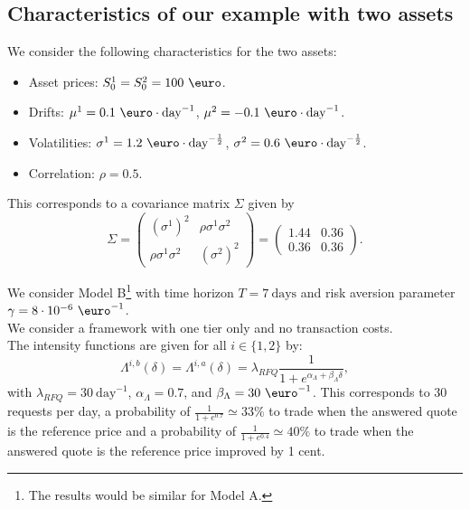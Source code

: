 \documentclass[preprint, 3p]{elsarticle}
\newcommand{\1}{{\chi}}
\begin{document}
\subsection{Characteristics of our example with two assets}
\vspace{3mm}

We consider the following characteristics for the two assets:
\begin{itemize}
    \item Asset prices: $S^1_0 = S^2_0 = 100\ \textrm{\euro}$.
    \item Drifts: $\mu^1 = 0.1\ \textrm{\euro}\cdot \textrm{day}^{-1}$, $\mu^2 = -0.1\ \textrm{\euro}\cdot \textrm{day}^{-1}$.
    \item Volatilities: $\sigma^1 = 1.2\ \textrm{\euro}\cdot \textrm{day}^{-\frac 12}$, $\sigma^2 = 0.6\ \textrm{\euro}\cdot \textrm{day}^{-\frac 12}$.
    \item Correlation: $\rho = 0.5.$
\end{itemize}
This corresponds to a covariance matrix $\Sigma$ given by
$$\Sigma = \begin{pmatrix}(\sigma^1)^2 & \rho \sigma^1 \sigma^2 \\ \rho \sigma^1 \sigma^2 & (\sigma^2)^2  \end{pmatrix} = \begin{pmatrix}1.44 & 0.36 \\ 0.36 & 0.36  \end{pmatrix}.$$

We consider Model B\footnote{The results would be similar for Model A.} with time horizon $T = 7\ \textrm{days}$ and risk aversion parameter~$\gamma=8 \cdot 10^{-6}\ \textrm{\euro}^{-1}$.\\

We consider a framework with one tier only and no transaction costs.\\

The intensity functions are given for all $i \in \{1,2\}$ by:
$$\Lambda^{i,b}(\delta) = \Lambda^{i,a}(\delta) = \lambda_{RFQ} \frac 1{1 + e^{\alpha_\Lambda + \beta_\Lambda \delta}},$$
with $\lambda_{RFQ} = 30\ \textrm{day}^{-1}$, $\alpha_\Lambda = 0.7$, and $\beta_\Lambda = 30\ \textrm{\euro}^{-1}$. This corresponds to $30$ requests per day, a probability of $\frac 1{1 + e^{0.7}}\simeq 33 \% $ to trade when the answered quote is the reference price and a probability of $\frac 1{1+e^{0.4}} \simeq 40\% $ to trade when the answered quote is the reference price improved by 1 cent.\\
\end{document}
